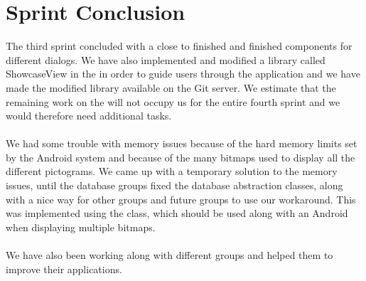 
\chapter{Sprint Conclusion}
\label{cha:conclusion_sprint_3}

The third sprint concluded with a close to finished \ct and finished components for different dialogs. We have also implemented and modified a library called ShowcaseView in the \ct in order to guide users through the application and we have made the modified library available on the \giraf Git server. We estimate that the remaining work on the \ct will not occupy us for the entire fourth sprint and we would therefore need additional tasks.
\\\\
We had some trouble with memory issues because of the hard memory limits set by the Android system and because of the many bitmaps used to display all the different pictograms. We came up with a temporary solution to the memory issues, until the database groups fixed the database abstraction classes, along with a nice way for other groups and future groups to use our workaround. This was implemented using the  class, which should be used along with an Android  when displaying multiple bitmaps.
\\\\
We have also been working along with different groups and helped them to improve their applications. 